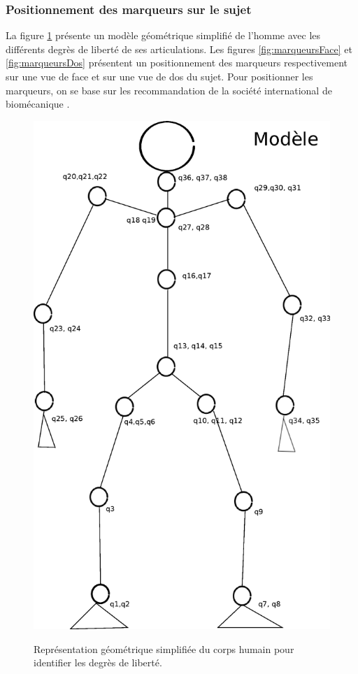 \documentclass[a4paper, 10pt ]{article}
\begin{document}
\subsubsection{Positionnement des marqueurs sur le sujet }

La figure \ref{fig:definitionQ} présente un modèle géométrique simplifié de l'homme avec les différents degrès de liberté de ses articulations.
Les figures \ref{fig:marqueursFace} et \ref{fig:marqueursDos} présentent  un positionnement des marqueurs respectivement sur une vue de face  et sur une vue de dos du sujet. Pour positionner les marqueurs, on se base sur les recommandation de la société international de biomécanique \cite{Wu02, Wu05}.
\begin{figure}
\includegraphics[width=0.7\columnwidth]{images/modeleHommeQ.eps}
\label{fig:definitionQ}
\caption{Représentation géométrique simplifiée du corps humain pour identifier les degrès de liberté.}
\end{figure}
\end{document}

